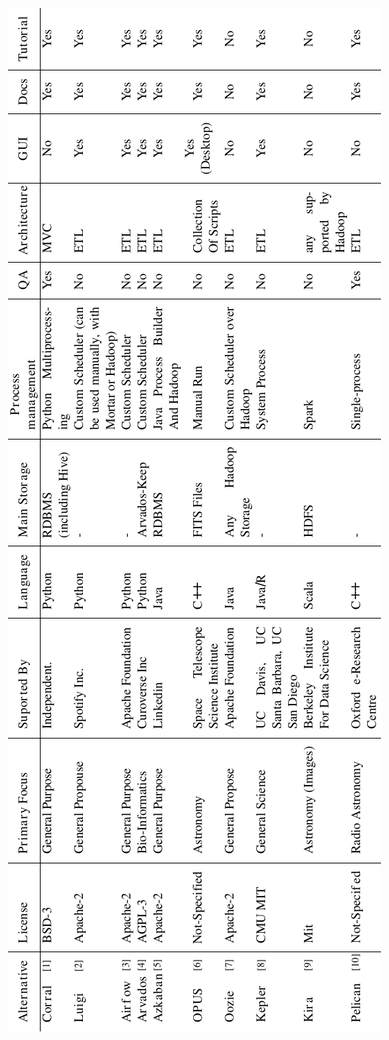 \documentclass[final,5p,times,twocolumn,authoryear]{elsarticle}
\begin{document}
\begin{figure}[ht]
\centering
\includegraphics[height=.78\textheight,keepaspectratio=1]{tabla.pdf}
\end{figure}
\end{document}
